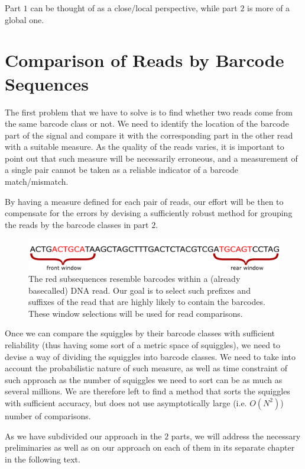 Part $1$ can be thought of as a close/local perspective, while part $2$ is more of a global one.

\section{Comparison of Reads by Barcode Sequences}
The first problem that we have to solve is to find whether two reads come from the same barcode class or not. We need to identify the location of the barcode part of the signal and compare it with the corresponding part in the other read with a suitable measure. As the quality of the reads varies, it is important to point out that such measure will be necessarily erroneous, and a measurement of a single pair cannot be taken as a reliable indicator of a barcode match/mismatch.

By having a measure defined for each pair of reads, our effort will be then to compensate for the errors by devising a sufficiently robust method for grouping the reads by the barcode classes in part $2$.

\begin{figure}[!ht]
    \centering
    \includegraphics[scale=0.7]{images/barcode_selection.pdf}
    \caption[Window selection of ends]{The red subsequences resemble barcodes within a (already basecalled) DNA read. Our goal is to select such prefixes and suffixes of the read that are highly likely to contain the barcodes. These window selections will be used for read comparisons.}
    \label{fig:trim_errors}
\end{figure}

Once we can compare the squiggles by their barcode classes with sufficient reliability (thus having some sort of a metric space of squiggles), we need to devise a way of dividing the squiggles into barcode classes. We need to take into account the probabilistic nature of such measure, as well as time constraint of such approach as the number of squiggles we need to sort can be as much as several millions. We are therefore left to find a method that sorts the squiggles with sufficient accuracy, but does not use asymptotically large (i.e. $O(N^2)$) number of comparisons.

As we have subdivided our approach in the $2$ parts, we will address the necessary preliminaries as well as on our approach on each of them in its separate chapter in the following text.
